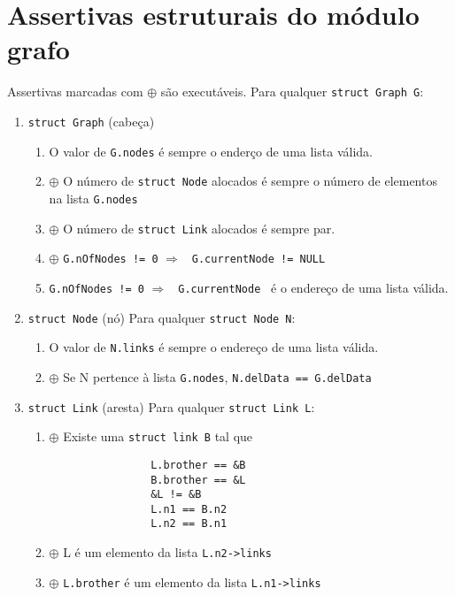 \documentclass[a4paper,8pt]{article}
\begin{document}
\section{Assertivas estruturais do módulo grafo}

Assertivas marcadas com $\oplus$ são executáveis.\newline
Para qualquer \texttt{struct Graph G}:
\begin{enumerate}

\item \texttt{struct Graph} (cabeça)
	\begin{enumerate}
		\item O valor de \texttt{G.nodes} é sempre o enderço de uma
			lista válida.
		\item $\oplus$ O número de \texttt{struct Node} alocados é sempre
			o número de elementos na lista \texttt{G.nodes}
		\item $\oplus$ O número de \texttt{struct Link} alocados é sempre par.
		\item $\oplus$ \texttt{G.nOfNodes != 0} $\Rightarrow$
			\texttt{ G.currentNode != NULL}
		\item \texttt{G.nOfNodes != 0} $\Rightarrow$
			\texttt{ G.currentNode } é o endereço de uma lista válida.
	\end{enumerate}

\item \texttt{struct Node} (nó)
	Para qualquer \texttt{struct Node N}:
	\begin{enumerate}
		\item O valor de \texttt{N.links} é sempre o endereço de uma lista válida.
		\item $\oplus$ Se N pertence à lista \texttt{G.nodes},
			\texttt{N.delData == G.delData}
	\end{enumerate}

\item \texttt{struct Link} (aresta)
	Para qualquer \texttt{struct Link L}:
	\begin{enumerate}
		\item $\oplus$ Existe uma \texttt{struct link B} tal que
			\begin{verbatim}
				L.brother == &B
				B.brother == &L
				&L != &B
				L.n1 == B.n2
				L.n2 == B.n1
			\end{verbatim}
		\item $\oplus$ L é um elemento da lista \texttt{L.n2->links}
		\item $\oplus$ \texttt{L.brother} é um elemento da lista
			\texttt{L.n1->links}
	\end{enumerate}
\end{enumerate}
\end{document}
